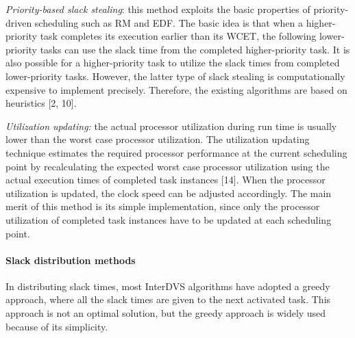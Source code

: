\documentclass[10pt,article]{IEEEtran}
\begin{document}


\emph{Priority-based slack stealing}: this method exploits the basic  properties of  priority-driven scheduling such as  RM and EDF. The basic idea is that when a higher-priority task completes its execution earlier than its WCET, the following lower-priority tasks  can use the  slack time from the completed higher-priority task.  It is also possible for a higher-priority task to utilize the slack times from completed lower-priority tasks.  However, the latter type of slack stealing is computationally expensive to implement precisely.  Therefore, the existing algorithms are based on heuristics [2, 10].

\emph{Utilization updating:} the actual processor utilization during run time is usually lower than the worst case processor utilization. The utilization updating technique estimates the required processor performance at the current scheduling point by recalculating the expected worst case processor utilization using the actual execution times of completed task instances [14].   When the processor utilization is updated, the clock speed can be adjusted accordingly. The main merit of this method is its simple implementation, since only the processor utilization of completed task instances have to be updated at each scheduling point.

\paragraph{Slack distribution methods} In distributing slack times, most InterDVS algorithms have adopted a greedy approach, where all the slack times are given to the next activated task. This  approach is not an optimal solution, but the greedy approach is widely used because of its simplicity.
\end{document}
